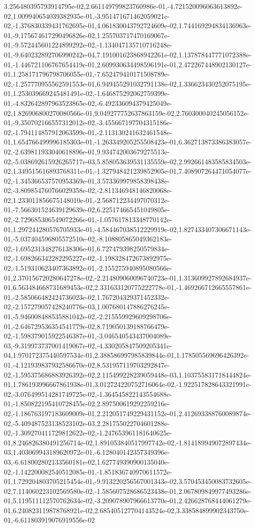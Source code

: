3.256480395793914795e-02,2.661149799823760986e-01,-4.721520096063613892e-02,1.009940654039382935e-01,-3.951471671462059021e-02,-1.376830339431762695e-01,4.061830043792724609e-02,1.744169294834136963e-01,-9.175674617290496826e-02,1.255703717470169067e-01,-9.572445601224899292e-02,-1.134047135710716248e-01,-9.640232892706990242e-04,7.191001623868942261e-02,1.137878447771072388e-01,-1.446721106767654419e-01,2.609930634498596191e-01,2.472267448902130127e-01,1.258171796798706055e-01,-7.652479410171508789e-02,-1.257770955562591553e-01,6.949455291032791138e-02,1.336623430252075195e-01,1.253039669245481491e-02,-1.646875292062759399e-01,-4.832642897963523865e-02,-6.492336094379425049e-02,1.826906800270080566e-01,9.049277752637863159e-02,2.760300040245056152e-01,-9.350702166557312012e-02,-3.455667197704315186e-02,-1.794114857912063599e-01,-2.113130241632461548e-01,1.654766499996185303e-01,-1.263349205255508423e-01,6.362713873386383057e-02,-2.639811933040618896e-01,9.934742003679275513e-02,-5.038692615926265717e-03,5.858053639531135559e-02,2.992661483585834503e-02,1.349515616893768311e-01,-1.327948421239852905e-01,7.408907264471054077e-02,-1.345366537570953369e-01,3.573369979858398438e-02,-3.809854760766029358e-02,-2.811346948146820068e-02,1.233011856675148010e-01,-2.568712234497070312e-01,-7.566301524639129639e-02,6.225174665451049805e-02,-2.729685306549072266e-01,-1.057617813348770142e-01,1.297244280576705933e-01,-4.584467038512229919e-02,1.827433407306671143e-01,-5.037404596805572510e-02,-8.108805865049362183e-02,-1.695231348276138306e-01,6.727479398250579834e-02,-1.698266342282295227e-02,-1.198328472673892975e-02,-1.519310623407363892e-01,-2.155275940895080566e-01,2.370156720280647278e-02,-2.214809060096740723e-01,1.313609927892684937e-01,6.563484668731689453e-02,2.331633120775222778e-01,-1.469266712665557861e-01,-2.585066482424736023e-02,1.767204329371452332e-02,-2.157279057428240776e-03,1.007680147886276245e-01,-5.946008488535881042e-02,-2.215559929609298706e-01,-2.646729536354541779e-02,8.719050139188766479e-02,-1.598379015922546387e-01,-3.046540543437004089e-03,-9.319973737001419067e-02,-4.330205847509205341e-04,1.970172375440597534e-01,2.388586997985839844e-01,1.178505569696426392e-01,-4.121939837932586670e-02,8.531957119703292847e-02,-1.595375686883926392e-02,2.115499228239059448e-03,1.103755831718444824e-01,1.786193996667861938e-01,3.012724220752716064e-02,-1.922517828643321991e-02,-3.076499514281749725e-02,-1.364545822143554688e-01,-1.850822195410728455e-02,2.897500619292259216e-02,-1.186763197183609009e-01,2.212051749229431152e-01,2.412693388760089874e-02,-5.409487523138523102e-03,2.281755022704601288e-02,-1.309270411729812622e-02,-1.247653961181640625e-01,8.246826380491256714e-02,1.891053840517997742e-02,-1.814189949072897434e-03,1.403069943189620972e-01,-6.128040142357349396e-03,-6.618002802133560181e-02,1.627749390900135040e-02,-1.142200082540512085e-01,-1.851836740970611572e-01,1.729204803705215454e-01,-9.913220256567001343e-02,3.570453450083732605e-02,7.114060223102569580e-02,-1.585607528686523438e-01,2.067809849977493286e-01,5.119511112570762634e-02,-3.209078907966613770e-01,2.426628768444061279e-01,6.240823119878768921e-02,2.685405127704143524e-02,3.338584899902343750e-01,-6.611803919076919556e-02
